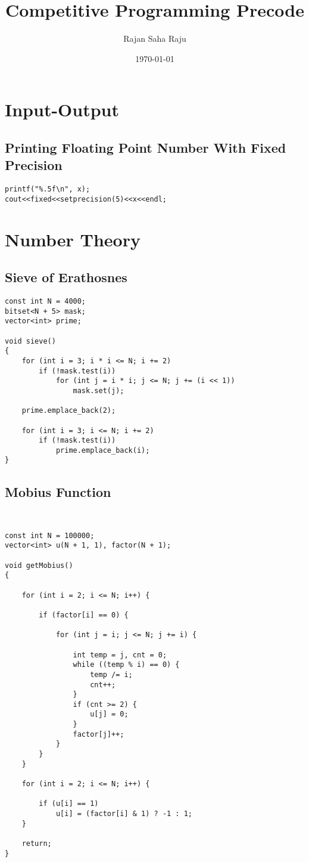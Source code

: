 \documentclass[14pt]{extarticle}
\title{Competitive Programming Precode}
\author{Rajan Saha Raju}
\date{\today}
\begin{document}
\maketitle
\newpage

\section{Input-Output}
\subsection{Printing Floating Point Number With Fixed Precision}

\begin{lstlisting}
printf("%.5f\n", x);
cout<<fixed<<setprecision(5)<<x<<endl;
\end{lstlisting}

\newpage

\section{Number Theory}
\subsection{Sieve of Erathosnes}

\begin{lstlisting}
const int N = 4000;
bitset<N + 5> mask;
vector<int> prime;

void sieve()
{
    for (int i = 3; i * i <= N; i += 2)
        if (!mask.test(i))
            for (int j = i * i; j <= N; j += (i << 1))
                mask.set(j);

    prime.emplace_back(2);

    for (int i = 3; i <= N; i += 2)
        if (!mask.test(i))
            prime.emplace_back(i);
}
\end{lstlisting}

\subsection{Mobius Function}
\begin{lstlisting}


const int N = 100000;
vector<int> u(N + 1, 1), factor(N + 1);

void getMobius()
{

    for (int i = 2; i <= N; i++) {

        if (factor[i] == 0) {

            for (int j = i; j <= N; j += i) {

                int temp = j, cnt = 0;
                while ((temp % i) == 0) {
                    temp /= i;
                    cnt++;
                }
                if (cnt >= 2) {
                    u[j] = 0;
                }
                factor[j]++;
            }
        }
    }

    for (int i = 2; i <= N; i++) {

        if (u[i] == 1)
            u[i] = (factor[i] & 1) ? -1 : 1;
    }

    return;
}

\end{lstlisting}
\end{document}
